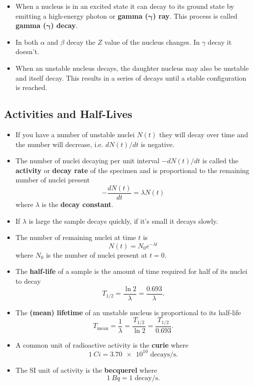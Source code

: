 \documentclass{article}
\begin{document}
\begin{itemize}
  \item When a nucleus is in an excited state it can decay to its ground state by emitting a high-energy photon or \textbf{gamma ($\boldsymbol{\gamma}$) ray}. This process is called \textbf{gamma ($\boldsymbol{\gamma}$) decay}.

  \item In both $\alpha$ and $\beta$ decay the $Z$ value of the nucleus changes. In $\gamma$ decay it doesn't.

  \item When an unstable nucleus decays, the daughter nucleus may also be unstable and itself decay. This results in a series of decays until a stable configuration is reached.
\end{itemize}

\subsection{Activities and Half-Lives}

\begin{itemize}
  \item If you have a number of unstable nuclei $N(t)$ they will decay over time and the number will decrease, i.e. $d N(t) / d t$ is negative.

  \item The number of nuclei decaying per unit interval $-d N(t) / d t$ is called the \textbf{activity} or \textbf{decay rate} of the specimen and is proportional to the remaining number of nuclei present \[-\frac{d N(t)}{d t} = \lambda N(t)\] where $\lambda$ is the \textbf{decay constant}.

  \item If $\lambda$ is large the sample decays quickly, if it's small it decays slowly.

  \item The number of remaining nuclei at time $t$ is \[N(t) = N_0 e^{-\lambda t}\] where $N_0$ is the number of nuclei present at $t = 0$.

  \item The \textbf{half-life} of a sample is the amount of time required for half of its nuclei to decay \[T_{1 / 2} = \frac{\ln 2}{\lambda} = \frac{0.693}{\lambda}.\]

  \item The \textbf{(mean) lifetime} of an unstable nucleus is proportional to its half-life \[T_\text{mean} = \frac{1}{\lambda} = \frac{T_{1 / 2}}{\ln 2} = \frac{T_{1 / 2}}{0.693}.\]

  \item A common unit of radioactive activity is the \textbf{curie} where \[\qty{1}{Ci} = \num{3.70e10} \text{ decays/s}.\]

  \item The SI unit of activity is the \textbf{becquerel} where \[\qty{1}{Bq} = 1 \text{ decay/s}.\]
\end{itemize}
\end{document}
